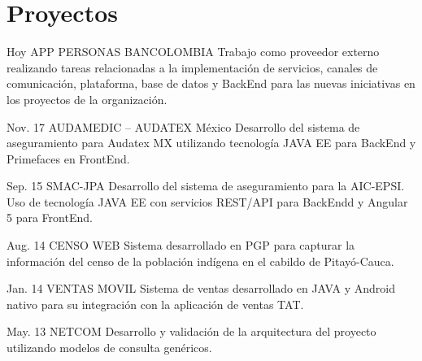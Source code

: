 \documentclass[]{cv-class}
\begin{document}
\section{Proyectos}
\begin{entrylist}
	\entry
	{Hoy}
	{APP PERSONAS BANCOLOMBIA}
	{\href{https://www.grupobancolombia.com/personas}{}}
	{\justifying Trabajo como proveedor externo realizando tareas relacionadas a la implementación de servicios, canales de comunicación, plataforma, base de datos y BackEnd para las nuevas iniciativas en los proyectos de la organización.}
	
	\entry
	{Nov. 17}
	{AUDAMEDIC – AUDATEX México}
	{\href{https://sitis.com.co/}{}}
	{\justifying Desarrollo del sistema de aseguramiento para Audatex MX utilizando tecnología JAVA EE para BackEnd y Primefaces en FrontEnd.}
	  
	\entry
	{Sep. 15}
	{SMAC-JPA}
	{}
	{\justifying Desarrollo del sistema de aseguramiento para la AIC-EPSI. Uso de tecnología JAVA EE con servicios REST/API para BackEndd y Angular 5 para FrontEnd.}
	
	\entry
	{Aug. 14}
	{CENSO WEB}
	{}
	{\justifying Sistema desarrollado en PGP para capturar la información del censo de la población indígena en el cabildo de Pitayó-Cauca.}
	
	\entry
	{Jan. 14}
	{VENTAS MOVIL}
	{}
	{\justifying Sistema de ventas desarrollado en JAVA y Android nativo para su integración con la aplicación de ventas TAT.}
	
	\entry
	{May. 13}
	{NETCOM}
	{}
	{\justifying Desarrollo y validación de la arquitectura del proyecto utilizando modelos de consulta genéricos.}
	
\end{entrylist}
\end{document}
